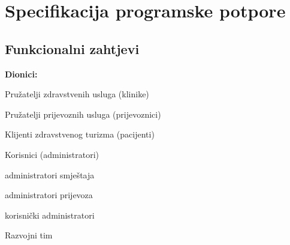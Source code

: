 \chapter{Specifikacija programske potpore}
		
	\section{Funkcionalni zahtjevi}
			\noindent \textbf{Dionici:}
			\begin{packed_enum}
				\item Pružatelji zdravstvenih usluga (klinike)
				\item Pružatelji prijevoznih usluga (prijevoznici)
				\item Klijenti zdravstvenog turizma (pacijenti)
				\item Korisnici (administratori)
				\begin{packed_enum}
					\item[a)] administratori smještaja
					\item[b)] administratori prijevoza
					\item[c)] korisnički administratori
				\end{packed_enum}
				\item Razvojni tim
			\end{packed_enum}
			
